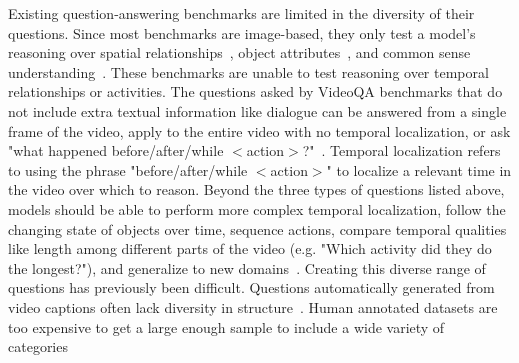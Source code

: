 \documentclass[10pt,twocolumn,letterpaper]{article}
\newcommand{\rak}[1]{{\color{red}{rak: #1}}}
\begin{document}

Existing question-answering benchmarks are limited in the diversity of their questions. Since most benchmarks are image-based, they only test a model's reasoning over spatial relationships~\cite{johnson2017clevr,hudson2019gqa,antol2015vqa,goyal2017making,krishna2017visual,zhu2016visual7w}, object attributes~\cite{johnson2017clevr,hudson2019gqa, antol2015vqa,goyal2017making,krishna2017visual}, and common sense understanding~\cite{zellers2019recognition,antol2015vqa,krishna2017visual}. These benchmarks are unable to test reasoning over temporal relationships or activities. 
The questions asked by VideoQA benchmarks that do not include extra textual information like dialogue can be answered from a single frame of the video, apply to the entire video with no temporal localization, or ask "what happened before/after/while $<$action$>$?"~\cite{jang2017tgif,xu2017video, maharaj2017dataset, zeng2016leveraging, yu2019activitynet}. Temporal localization refers to using the phrase "before/after/while $<$action$>$" to localize a relevant time in the video over which to reason. Beyond the three types of questions listed above, models should be able to perform more complex temporal localization, follow the changing state of objects over time, sequence actions, compare temporal qualities like length among different parts of the video (e.g. "Which activity did they do the longest?"), and generalize to new domains~\cite{lake2018generalization,vatashsky2020vqa}. Creating this diverse range of questions has previously been difficult. Questions automatically generated from video captions often lack diversity in structure~\cite{yu2019activitynet, jang2017tgif}. Human annotated datasets are too expensive to get a large enough sample to include a wide variety of categories~\cite{zeng2016leveraging, yu2019activitynet}
\end{document}
